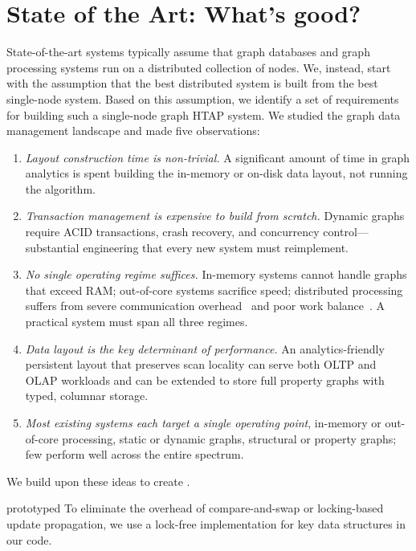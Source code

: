 \section{State of the Art: What's good?}
\label{intro:whats_good}
State-of-the-art systems typically assume that graph databases and graph processing systems run on a distributed collection of nodes.
We, instead, start with the assumption that the best distributed system is built from the best single-node system.
Based on this assumption, we identify a set of requirements for building such a single-node graph \ac{HTAP} system.
We studied the graph data management landscape and made five observations:
\begin{enumerate}
  \item \textit{Layout construction time is non-trivial.} A significant amount of time in graph analytics is spent building the in-memory or on-disk data layout, not running the algorithm.
  \item \textit{Transaction management is expensive to build from scratch.} Dynamic graphs require ACID transactions, crash recovery, and concurrency control---substantial engineering that every new system must reimplement.
  \item \textit{No single operating regime suffices.} In-memory systems cannot handle graphs that exceed RAM; out-of-core systems sacrifice speed; distributed processing suffers from severe communication overhead~\cite{mcsherry2015scalability,beamer2016understanding} and poor work balance~\cite{hajidehi2023cuttana}. A practical system must span all three regimes.
  \item \textit{Data layout is the key determinant of performance.} An analytics-friendly persistent layout that preserves scan locality can serve both OLTP and OLAP workloads and can be extended to store full property graphs with typed, columnar storage.
  \item \textit{Most existing systems each target a single operating point}, in-memory or out-of-core processing, static or dynamic graphs, structural or property graphs; few perform well across the entire spectrum.
\end{enumerate}

We build upon these ideas to create \project{}.
\begin{statusbar}{prototyped}
To eliminate the overhead of compare-and-swap or locking-based update propagation, we use a lock-free implementation for key data structures in our code. 
\end{statusbar}

